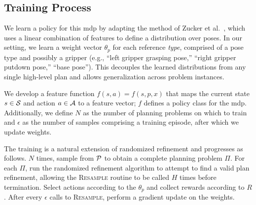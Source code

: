 
\subsection{Training Process}
We learn a policy for this {\sc mdp} by adapting the method of Zucker et al.~\cite{workspacebias}, which
uses a linear combination of features to define a distribution over poses. In our setting, we learn a weight
vector $\theta_{p}$ for each reference \emph{type}, comprised of a pose type and possibly a gripper
(e.g., ``left gripper grasping pose,'' ``right gripper putdown pose,'' ``base pose'').
This decouples the learned distributions from any single high-level plan and allows generalization across problem instances.

We develop a feature function $f(s, a) = f(s, p, x)$ that maps the current
state $s \in \mathcal{S}$ and action $a \in \mathcal{A}$ to a
feature vector; $f$ defines a policy class for the {\sc mdp}. Additionally, we define
$N$ as the number of planning problems on which to train and
$\epsilon$ as the number of samples comprising a training episode, after which we update weights.

The training is a natural extension of randomized
refinement and progresses as follows. $N$ times, sample from $\mathcal{P}$ to obtain
a complete planning problem $\Pi$. For each $\Pi$, run the randomized refinement
algorithm to attempt to find a valid plan refinement, allowing the \textsc{Resample}
routine to be called $H$ times before termination. Select actions according to the $\theta_{p}$
and collect rewards according to $R$. After every $\epsilon$ calls to
\textsc{Resample}, perform a gradient update on the weights.

